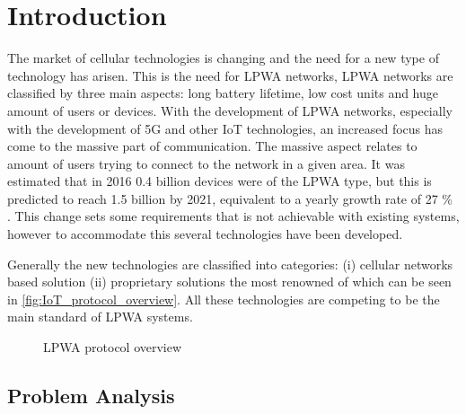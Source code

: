 \chapter{Introduction}\label{ch:Introduction}




The market of cellular technologies is changing and the need for a new type of technology has arisen. This is the need for \gls{LPWA} networks, \gls{LPWA} networks are classified by three main aspects: long battery lifetime, low cost units and huge amount of users or devices. With the development of \gls{LPWA} networks, especially with the development of 5G and other \gls{IoT} technologies, an increased focus has come to the massive part of communication. The massive aspect relates to amount of users trying to connect to the network in a given area. It was estimated that in 2016 0.4 billion devices were of the \gls{LPWA} type, but this is predicted to reach 1.5 billion by 2021, equivalent to a yearly growth rate of 27 \% \citep{mobi-report}. This change sets some requirements that is not achievable with existing systems, however to accommodate this several technologies have been developed.


Generally the new technologies are classified into categories: (i) cellular networks based solution (ii) proprietary solutions the most renowned of which can be seen in \autoref{fig:IoT_protocol_overview}. All these technologies are competing to be the main standard of LPWA systems. 

\begin{figure}[H]
\centering
\caption{LPWA protocol overview}
\label{fig:IoT_protocol_overview}
\end{figure}



\section{Problem Analysis}


